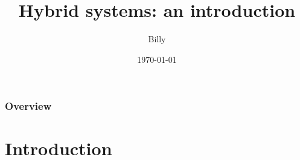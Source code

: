 
\title{Hybrid systems: an introduction} %

\author{Billy} %
\date{\today} %



\begin{frame}
\titlepage %
\end{frame}

\begin{frame}
\frametitle{Overview} %
\tableofcontents %
\end{frame}


\section{Introduction} %

